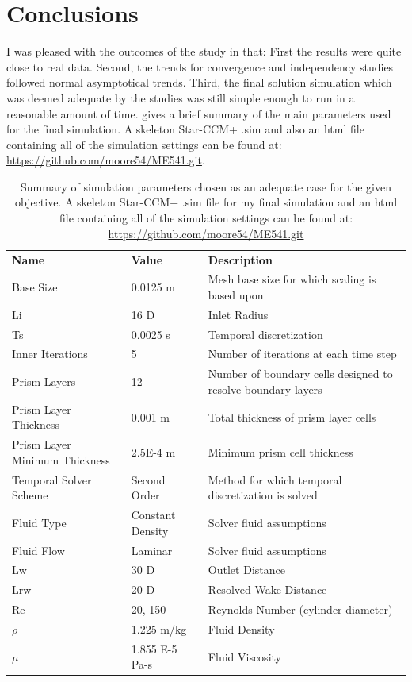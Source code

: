 \documentclass[10pt,english]{article}
\begin{document}
\section{Conclusions}

I was pleased with the outcomes of the study in that: First the results were quite close to real data.  Second, the trends for convergence and independency studies followed normal asymptotical trends.  Third, the final solution simulation which was deemed adequate by the studies was still simple enough to run in a reasonable amount of time.   gives a brief summary of the main parameters used for the final simulation. A skeleton Star-CCM+ .sim and also an html file containing all of the simulation settings can be found at: \href{https://github.com/moore54/ME541.git}{https://github.com/moore54/ME541.git}.

\begin{table}[h]
\vspace{20pt}
\centering
  \begin{tabular}{lll}
    \textbf{Name} & \textbf{Value} & \textbf{Description}  \\
    Base Size & 0.0125 m & Mesh base size for which scaling is based upon  \\
    Li & 16 D & Inlet Radius\\
    Ts & 0.0025 s & Temporal discretization\\
    Inner Iterations & 5 & Number of iterations at each time step\\
    Prism Layers & 12 & Number of boundary cells designed to resolve boundary layers\\
    Prism Layer Thickness & 0.001 m & Total thickness of prism layer cells\\
    Prism Layer Minimum Thickness & 2.5E-4 m & Minimum prism cell thickness\\ 
    Temporal Solver Scheme & Second Order & Method for which temporal discretization is solved\\
    Fluid Type & Constant Density & Solver fluid assumptions\\
    Fluid Flow & Laminar & Solver fluid assumptions\\
    Lw & 30 D & Outlet Distance\\
    Lrw & 20 D & Resolved Wake Distance\\
    Re & 20, 150 & Reynolds Number (cylinder diameter)\\
    $\rho$  & 1.225 m/kg & Fluid Density\\
    $\mu$  & 1.855 E-5 Pa-s & Fluid Viscosity\\ 
  \end{tabular}
  \caption{Summary of simulation parameters chosen as an adequate case for the given objective. A skeleton Star-CCM+ .sim file for my final simulation and an html file containing all of the simulation settings can be found at: \href{https://github.com/moore54/ME541.git}{https://github.com/moore54/ME541.git}}
  \label{tab:chosen_sim}
\end{table}
\end{document}
